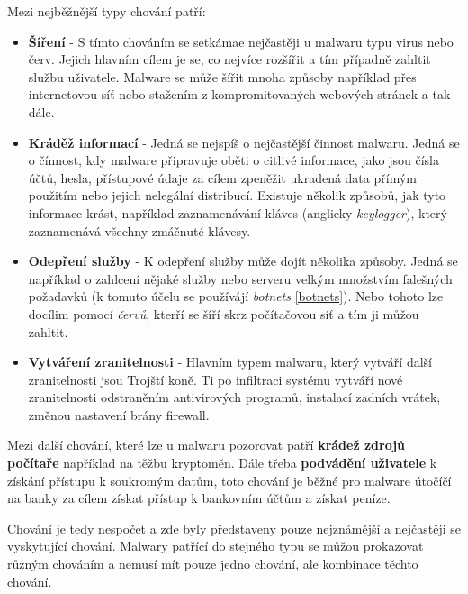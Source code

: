 Mezi nejběžnější typy chování patří:
\begin{itemize}
    \item \textbf{Šíření} - S tímto chováním se setkámae nejčastěji u malwaru typu virus nebo červ. Jejich hlavním cílem je se, co nejvíce rozšířit a tím případně zahltit službu uživatele. Malware se může šířit mnoha způsoby například přes internetovou síť nebo stažením z kompromitovaných webových stránek a tak dále.
    \item \textbf{Kráděž informací} - Jedná se nejspíš o nejčastější činnost malwaru. Jedná se o čínnost, kdy malware připravuje oběti o citlivé informace, jako jsou čísla účtů, hesla, přístupové údaje za cílem zpeněžit ukradená data přímým použitím nebo jejich nelegální distribucí. Existuje několik způsobů, jak tyto informace krást, například zaznamenávání kláves (anglicky \textit{keylogger}), který zaznamenává všechny zmáčnuté klávesy.
    \item \textbf{Odepření služby} - K odepření služby může dojít několika způsoby. Jedná se například o zahlcení nějaké služby nebo serveru velkým množstvím falešných požadavků (k tomuto účelu se používájí \textit{botnets} \ref{botnets}). Nebo tohoto lze docílim pomocí \textit{červů}, kterří se šíří skrz počítačovou síť a tím ji můžou zahltit.
    \item \textbf{Vytváření zranitelnosti} - Hlavním typem malwaru, který vytváří další zranitelnosti jsou Trojští koně. Ti po infiltraci systému vytváří nové zranitelnosti odstraněním antivirových programů, instalací zadních vrátek, změnou nastavení brány firewall.
\end{itemize}

Mezi další chování, které lze u malwaru pozorovat patří \textbf{krádež zdrojů počítaře} například na těžbu kryptoměn. Dále třeba \textbf{podvádění uživatele} k získání přístupu k soukromým datům, toto chování je běžné pro malware útočíčí na banky za cílem získat přístup k bankovním účtům a získat peníze.

Chování je tedy nespočet a zde byly představeny pouze nejznámější a nejčastěji se vyskytující chování. Malwary patřící do stejného typu se můžou prokazovat různým chováním a nemusí mít pouze jedno chování, ale kombinace těchto chování.
